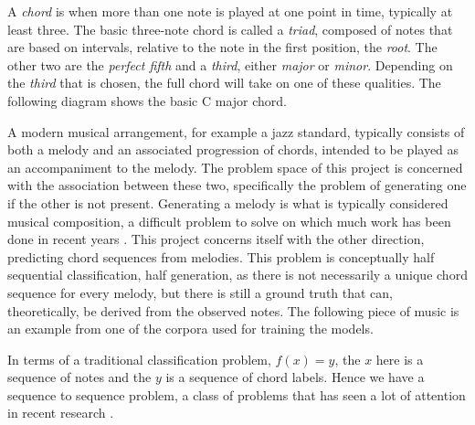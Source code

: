 \documentclass[bsc,singlespacing,logo, parskip, deptreport]{infthesis}
\begin{document}
A {\em chord} is when more than one note is played at one point in time, typically at least three. The basic three-note chord is called a {\em triad}, composed of notes that are based on intervals, relative to the note in the first position, the {\em root}. The other two are the {\em perfect fifth} and a {\em third}, either {\em major} or {\em minor}. Depending on the {\em third} that is chosen, the full chord will take on one of these qualities. The following diagram shows the basic C major chord.

\begin{center}
  {%
\parindent 0pt
\noindent
\ifx\preLilyPondExample \undefined
\else
  \expandafter\preLilyPondExample
\fi
\def\lilypondbook{}%

\ifx\postLilyPondExample \undefined
\else
  \expandafter\postLilyPondExample
\fi
}
\end{center}

A modern musical arrangement, for example a jazz standard, typically consists of both a melody and an associated progression of chords, intended to be played as an accompaniment to the melody. The problem space of this project is concerned with the association between these two, specifically the problem of generating one if the other is not present. Generating a melody is what is typically considered musical composition, a difficult problem to solve on which much work has been done in recent years \cite{conklin2003music} \cite{nierhaus2009algorithmic} \cite{inesta2016machine} \cite{whorley2016music}. This project concerns itself with the other direction, predicting chord sequences from melodies. This problem is conceptually half sequential classification, half generation, as there is not necessarily a unique chord sequence for every melody, but there is still a ground truth that can, theoretically, be derived from the observed notes. The following piece of music is an example from one of the corpora used for training the models.

\begin{center}
  {%
\parindent 0pt
\noindent
\ifx\preLilyPondExample \undefined
\else
  \expandafter\preLilyPondExample
\fi
\def\lilypondbook{}%

\ifx\postLilyPondExample \undefined
\else
  \expandafter\postLilyPondExample
\fi
}
\end{center}

In terms of a traditional classification problem, $f(x) = y$, the $x$ here is a sequence of notes and the $y$ is a sequence of chord labels. Hence we have a sequence to sequence problem, a class of problems that has seen a lot of attention in recent research \cite{sutskever2014sequence} \cite{luong2015multi} \cite{duvsek2016sequence}.
\end{document}

